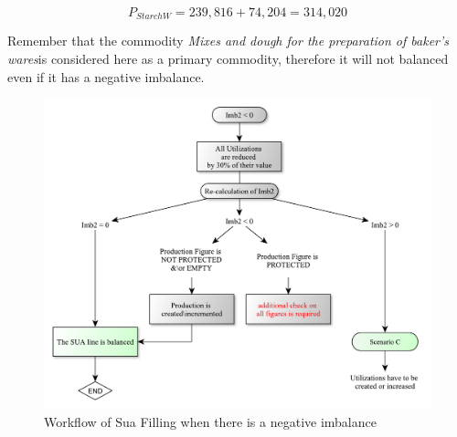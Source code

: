 \documentclass[]{article}
\begin{document}
\begin{equation}
\label{eq:prod}
P_{StarchW} = 239,816 + 74,204 = 314,020
\end{equation}

Remember that the commodity \emph{Mixes and dough for the preparation of
baker's wares}is considered here as a primary commodity, therefore it
will not balanced even if it has a negative imbalance.

\begin{figure}

{\centering \includegraphics{images/06_NegativeImbalance} 

}

\caption{\label{fig:f5}Workflow of Sua Filling when there is a negative imbalance}\label{fig:f6}
\end{figure}
\end{document}
